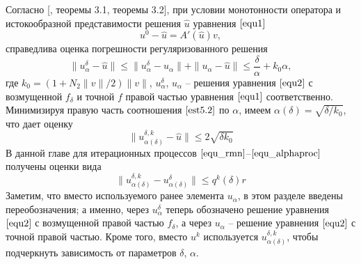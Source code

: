 Согласно [\cite{Tau2002}, теоремы 3.1, теоремы 3.2], при условии монотонности оператора и истокообразной представимости решения $\hat{u}$ уравнения $\eqref{equ1}$
\begin{equation}\label{cond5.1}
u^0-\hat{u}=A'(\hat{u})v,
\end{equation}
справедлива оценка погрешности регуляризованного решения
\begin{equation}\label{est5.2}
\|u_\alpha^{\delta}-\hat{u}\|\le\|u_\alpha^{\delta}-u_\alpha\|+\|u_\alpha-\hat{u}\|\le\frac{\delta}{\alpha}+k_0\alpha,
\end{equation}
где $k_0=(1+N_2\|v\|/2)\|v\|$, $u_\alpha^{\delta}$, $u_\alpha$ -- решения уравнения $\eqref{equ2}$ с возмущенной $f_\delta$ и точной $f$ правой частью уравнения $\eqref{equ1}$ соответственно. Минимизируя правую часть соотношения $\eqref{est5.2}$ по $\alpha$, имеем $\alpha(\delta)=\sqrt{\delta /k_0}$, что дает оценку
\begin{equation}\label{est5.3}
\|u_{\alpha(\delta)}^{\delta, k}-\hat{u}\|\le 2\sqrt{\delta k_0}
\end{equation}
В данной главе для итерационных процессов $\eqref{equ_rmn}$--$\eqref{equ_alphaproc}$ получены оценки вида 
\begin{equation}\label{est5.4}
\|u_{\alpha(\delta)}^{\delta, k}-u_{\alpha(\delta)}^{\delta}\|\le q^k(\delta)r
\end{equation}
Заметим, что вместо используемого ранее элемента $u_\alpha$, в этом разделе введены переобозначения; а именно, через $u_\alpha^{\delta}$ теперь обозначено решение уравнения $\eqref{equ2}$ с возмущенной правой частью $f_\delta$, а через $u_\alpha$ -- решение уравнения $\eqref{equ2}$ с точной правой частью. Кроме того, вместо $u^k$ используется $u_{\alpha(\delta)}^{\delta, k}$, чтобы подчеркнуть зависимость от параметров $\delta$, $\alpha$.

